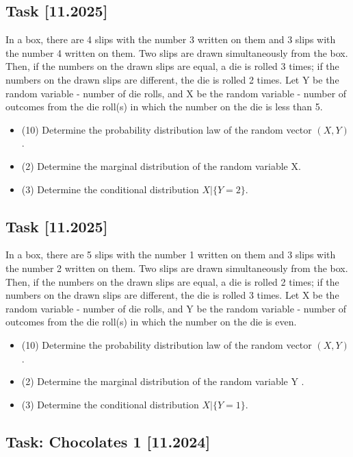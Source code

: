 \documentclass[a4paper, 12pt]{article}
\begin{document}
\subsection*{Task [11.2025]}
In a box, there are 4 slips with the number 3 written on them and 3 slips with the number 4 written on them. Two slips are drawn simultaneously from the box. Then, if the numbers on the drawn slips are equal, a die is rolled 3 times; if the numbers on the drawn slips are different, the die is rolled 2
times. Let Y be the random variable - number of die rolls, and X be the random variable - number of
outcomes from the die roll(s) in which the number on the die is less than 5.
\begin{itemize}
    \item [a)] (10) Determine the probability distribution law of the random vector $(X, Y )$.
    \item [b)] (2) Determine the marginal distribution of the random variable X.
    \item [c)] (3) Determine the conditional distribution $X|\{Y = 2\}$.
\end{itemize}

\subsection*{Task [11.2025]}
In a box, there are 5 slips with the number 1 written on them and 3 slips with the number 2 written
on them. Two slips are drawn simultaneously from the box. Then, if the numbers on the drawn slips
are equal, a die is rolled 2 times; if the numbers on the drawn slips are different, the die is rolled 3
times. Let X be the random variable - number of die rolls, and Y be the random variable - number of
outcomes from the die roll(s) in which the number on the die is even.
\begin{itemize}
    \item [a)] (10) Determine the probability distribution law of the random vector $(X, Y )$.
\item [b)] (2) Determine the marginal distribution of the random variable Y .
\item [c)] (3) Determine the conditional distribution $X|\{Y = 1\}$.
\end{itemize}

\subsection*{Task: Chocolates 1 [11.2024]}
\end{document}

